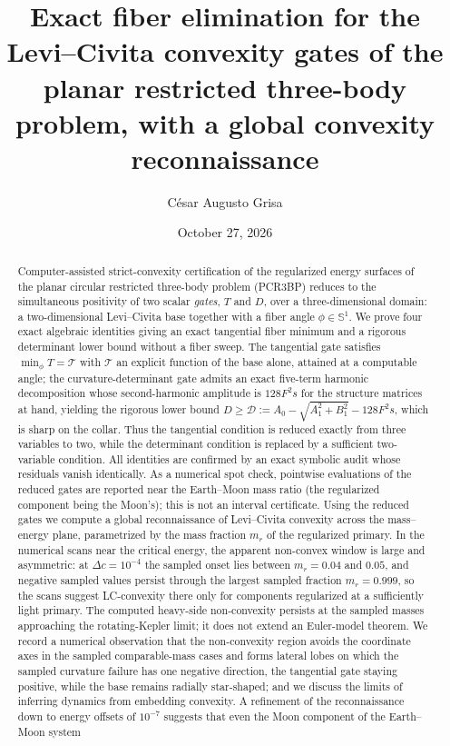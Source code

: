 \documentclass[11pt,reqno]{amsart}
\theoremstyle{plain}
\theoremstyle{definition}
\newcommand{\Sph}{\mathbb{S}}
\newcommand{\calT}{\mathcal{T}}
\newcommand{\calD}{\mathcal{D}}
\begin{document}
\title[Exact fiber elimination for the PCR3BP convexity gates]{Exact fiber elimination for the Levi--Civita convexity gates of the planar restricted three-body problem, with a global convexity reconnaissance}

\author{C\'esar Augusto Grisa}

\date{October 27, 2026}


\begin{abstract}
Computer-assisted strict-convexity certification of the regularized energy surfaces of the planar circular restricted three-body problem (PCR3BP) reduces to the simultaneous positivity of two scalar \emph{gates}, $T$ and $D$, over a three-dimensional domain: a two-dimensional Levi--Civita base together with a fiber angle $\phi\in\Sph^1$. We prove four exact algebraic identities giving an exact tangential fiber minimum and a rigorous determinant lower bound without a fiber sweep. The tangential gate satisfies $\min_\phi T = \calT$ with $\calT$ an explicit function of the base alone, attained at a computable angle; the curvature-determinant gate admits an exact five-term harmonic decomposition whose second-harmonic amplitude is $128F^2 s$ for the structure matrices at hand, yielding the rigorous lower bound $D\ge \calD := A_0-\sqrt{A_1^2+B_1^2}-128F^2 s$, which is sharp on the collar. Thus the tangential condition is reduced exactly from three variables to two, while the determinant condition is replaced by a sufficient two-variable condition. All identities are confirmed by an exact symbolic audit whose residuals vanish identically. As a numerical spot check, pointwise evaluations of the reduced gates are reported near the Earth--Moon mass ratio (the regularized component being the Moon's); this is not an interval certificate. Using the reduced gates we compute a global reconnaissance of Levi--Civita convexity across the mass--energy plane, parametrized by the mass fraction $m_r$ of the regularized primary. In the numerical scans near the critical energy, the apparent non-convex window is large and asymmetric: at $\Delta c=10^{-4}$ the sampled onset lies between $m_r=0.04$ and $0.05$, and negative sampled values persist through the largest sampled fraction $m_r=0.999$, so the scans suggest LC-convexity there only for components regularized at a sufficiently light primary. The computed heavy-side non-convexity persists at the sampled masses approaching the rotating-Kepler limit; it does not extend an Euler-model theorem. We record a numerical observation that the non-convexity region avoids the coordinate axes in the sampled comparable-mass cases and forms lateral lobes on which the sampled curvature failure has one negative direction, the tangential gate staying positive, while the base remains radially star-shaped; and we discuss the limits of inferring dynamics from embedding convexity. A refinement of the reconnaissance down to energy offsets of $10^{-7}$ suggests that even the Moon component of the Earth--Moon system 
\end{abstract}
\end{document}
